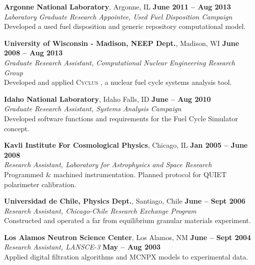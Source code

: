 \documentclass[margin,line]{resume}
\newcommand{\Cyclus}{\textsc{Cyclus }}
\begin{document}
\begin{resume}
    \textbf{Argonne National Laboratory}, Argonne, IL \hfill \textbf{June 2011 -- Aug 2013}\\
		\textsl{Laboratory Graduate Research Appointee, Used Fuel Disposition Campaign}\\ 
		Developed a used fuel disposition and generic repository computational model.

    \textbf{University of Wisconsin - Madison, NEEP Dept.}, Madison, WI \hfill \textbf{June 2008 -- Aug 2013}\\
		\textsl{Graduate Research Assistant, Computational Nuclear Engineering Research Group}\\ 
		Developed and applied \Cyclus, a nuclear fuel cycle systems analysis tool.

    \textbf{Idaho National Laboratory}, Idaho Falls, ID \hfill \textbf{June -- Aug 2010}\\
		\textsl{Graduate Research Assistant, Systems Analysis Campaign}\\ 
		Developed software functions and requirements for the Fuel Cycle Simulator concept.

    \textbf{Kavli Institute For Cosmological Physics}, Chicago, IL \hfill \textbf{Jan 2005 -- June 2008}\\
                \textsl{Research Assistant, Laboratory for Astrophysics and Space Research}\\
                Programmed \& machined instrumentation. Planned protocol for QUIET polarimeter calibration.

    \textbf{Universidad de Chile, Physics Dept.}, Santiago, Chile \hfill \textbf{June -- Sept 2006}\\
                \textsl{Research Assistant, Chicago-Chile Research Exchange Program}\\
                 Constructed and operated a far from equilibrium granular materials experiment.

    \textbf{Los Alamos Neutron Science Center}, Los Alamos, NM \hfill \textbf{June -- Sept 2004}\\ 
                \textsl{Research Assistant, LANSCE-3} \hfill \textbf{May -- Aug 2003}\\
                Applied digital filtration algorithms and MCNPX models to experimental data.
    \pagebreak

               \vspace{-2mm}

\end{resume}
\end{document}
